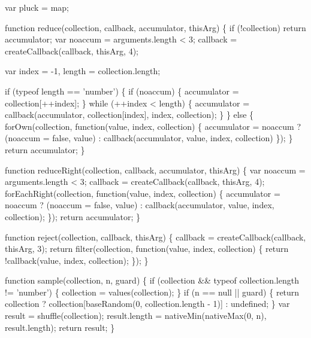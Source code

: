\begin{DoxyCodeInclude}
{{  var pluck = map;

  \textcolor{keyword}{function} reduce(collection, callback, accumulator, thisArg) \{
    \textcolor{keywordflow}{if} (!collection) \textcolor{keywordflow}{return} accumulator;
    var noaccum = arguments.length < 3;
    callback = createCallback(callback, thisArg, 4);

    var index = -1,
        length = collection.length;

    \textcolor{keywordflow}{if} (typeof length == \textcolor{stringliteral}{'number'}) \{
      \textcolor{keywordflow}{if} (noaccum) \{
        accumulator = collection[++index];
      \}
      \textcolor{keywordflow}{while} (++index < length) \{
        accumulator = callback(accumulator, collection[index], index, collection);
      \}
    \} \textcolor{keywordflow}{else} \{
      forOwn(collection, \textcolor{keyword}{function}(value, index, collection) \{
        accumulator = noaccum
          ? (noaccum = \textcolor{keyword}{false}, value)
          : callback(accumulator, value, index, collection)
      \});
    \}
    \textcolor{keywordflow}{return} accumulator;
  \}

  \textcolor{keyword}{function} reduceRight(collection, callback, accumulator, thisArg) \{
    var noaccum = arguments.length < 3;
    callback = createCallback(callback, thisArg, 4);
    forEachRight(collection, \textcolor{keyword}{function}(value, index, collection) \{
      accumulator = noaccum
        ? (noaccum = \textcolor{keyword}{false}, value)
        : callback(accumulator, value, index, collection);
    \});
    \textcolor{keywordflow}{return} accumulator;
  \}

  \textcolor{keyword}{function} reject(collection, callback, thisArg) \{
    callback = createCallback(callback, thisArg, 3);
    \textcolor{keywordflow}{return} filter(collection, \textcolor{keyword}{function}(value, index, collection) \{
      \textcolor{keywordflow}{return} !callback(value, index, collection);
    \});
  \}

  \textcolor{keyword}{function} sample(collection, n, guard) \{
    \textcolor{keywordflow}{if} (collection && typeof collection.length != \textcolor{stringliteral}{'number'}) \{
      collection = values(collection);
    \}
    \textcolor{keywordflow}{if} (n == null || guard) \{
      \textcolor{keywordflow}{return} collection ? collection[baseRandom(0, collection.length - 1)] : undefined;
    \}
    var result = shuffle(collection);
    result.length = nativeMin(nativeMax(0, n), result.length);
    \textcolor{keywordflow}{return} result;
  \}

}}
\end{DoxyCodeInclude}
